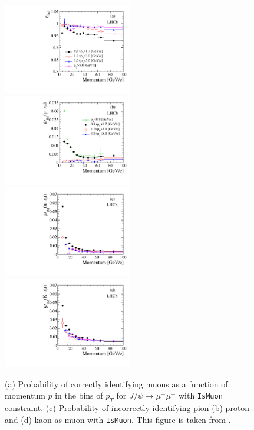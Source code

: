 \begin{figure}[!h]
	\includegraphics[width = 0.5\textwidth]{figs/detector/dllFit_mu_IMvsPvsPt.pdf}%
	\includegraphics[width = 0.5\textwidth]{figs/detector/dllFit_P_IMvsPvsPt.pdf}%
       \newline
	\includegraphics[width = 0.5\textwidth]{figs/detector/dllFit_pi_IMvsPvsPt.pdf}%
	\includegraphics[width = 0.5\textwidth]{figs/detector/dllFit_ka_IMvsPvsPt.pdf}%
	\caption{(a) Probability of correctly identifying muons as a function of momentum $p$ in the bins of $p_{T}$ for $J/\psi \rightarrow \mu^{+} \mu^{-}$ with \texttt{IsMuon} constraint. (c) Probability of incorrectly identifying pion (b) proton and (d) kaon as muon with \texttt{IsMuon}. This figure is taken from \cite{LHCb-DP-2013-001}. }  
	\label{fig:MuonID}
\end{figure}



